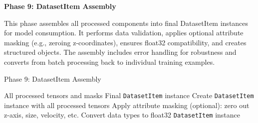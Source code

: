 \textbf{Phase 9: DatasetItem Assembly}

This phase assembles all processed components into final DatasetItem instances for model consumption. It performs data validation, applies optional attribute masking (e.g., zeroing z-coordinates), ensures float32 compatibility, and creates structured objects. The assembly includes error handling for robustness and converts from batch processing back to individual training examples.

\begin{algorithm}[H]
\caption{Phase 9: DatasetItem Assembly}
\label{alg:phase9_assembly}
\begin{algorithmic}[1]
\REQUIRE All processed tensors and masks
\ENSURE Final \texttt{DatasetItem} instance
\STATE Create \texttt{DatasetItem} instance with all processed tensors
\STATE Apply attribute masking (optional): zero out z-axis, size, velocity, etc.
\STATE Convert data types to float32
\RETURN \texttt{DatasetItem} instance
\end{algorithmic}
\end{algorithm}
